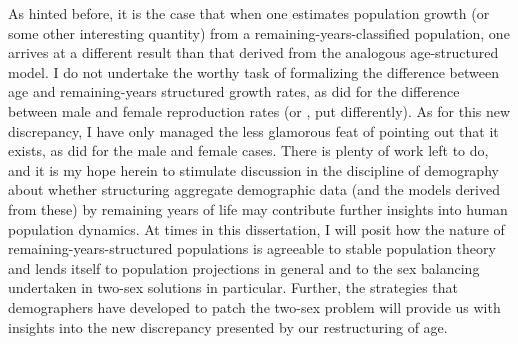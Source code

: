 As hinted before, it is the case that when one estimates population growth (or
some other interesting quantity) from a remaining-years-classified population,
one arrives at a different result than that derived from the analogous
age-structured model. I do not undertake the worthy task of formalizing the
difference between age and remaining-years structured growth rates, as did
\citet{karmel1947relations} for the difference between male and female
reproduction rates (or \citet{coale1972growth}, put differently). As for this
new discrepancy, I have only managed the less glamorous feat of pointing out
that it exists, as did \citet{kuczynski1932fertility} for the male
and female cases. There is plenty of work left to do, and it is my hope herein
to stimulate discussion in the discipline of demography about whether structuring
aggregate demographic data (and the models derived from these) by remaining
years of life may contribute further insights into human population dynamics. At
times in this dissertation, I will posit how the nature of
remaining-years-structured populations is agreeable to stable population theory
and lends itself to population projections in general and to the sex balancing
undertaken in two-sex solutions in particular. Further, the strategies that
demographers have developed to patch the two-sex problem will provide us with
insights into the new discrepancy presented by our restructuring of age.
